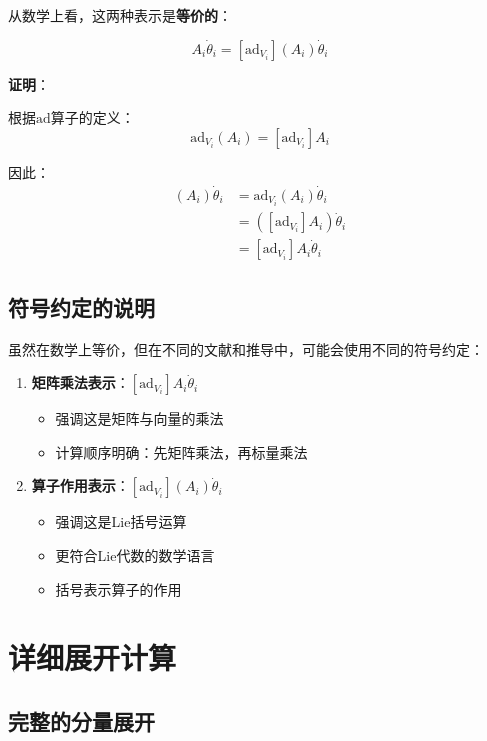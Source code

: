 \documentclass[12pt,a4paper]{article}
\begin{document}
从数学上看，这两种表示是\textbf{等价的}：

\begin{equation}
[\text{ad}_{V_i}] A_i \dot{\theta}_i = [\text{ad}_{V_i}](A_i) \dot{\theta}_i
\label{eq:equivalence}
\end{equation}

\textbf{证明}：

根据$\text{ad}$算子的定义：
\begin{equation}
\text{ad}_{V_i}(A_i) = [\text{ad}_{V_i}] A_i
\end{equation}

因此：
\begin{align}
[\text{ad}_{V_i}](A_i) \dot{\theta}_i &= \text{ad}_{V_i}(A_i) \dot{\theta}_i \\
&= ([\text{ad}_{V_i}] A_i) \dot{\theta}_i \\
&= [\text{ad}_{V_i}] A_i \dot{\theta}_i
\end{align}

\subsection{符号约定的说明}

虽然在数学上等价，但在不同的文献和推导中，可能会使用不同的符号约定：

\begin{enumerate}
\item \textbf{矩阵乘法表示}：$[\text{ad}_{V_i}] A_i \dot{\theta}_i$
\begin{itemize}
\item 强调这是矩阵与向量的乘法
\item 计算顺序明确：先矩阵乘法，再标量乘法
\end{itemize}

\item \textbf{算子作用表示}：$[\text{ad}_{V_i}](A_i) \dot{\theta}_i$
\begin{itemize}
\item 强调这是Lie括号运算
\item 更符合Lie代数的数学语言
\item 括号表示算子的作用
\end{itemize}
\end{enumerate}

\section{详细展开计算}

\subsection{完整的分量展开}
\end{document}
